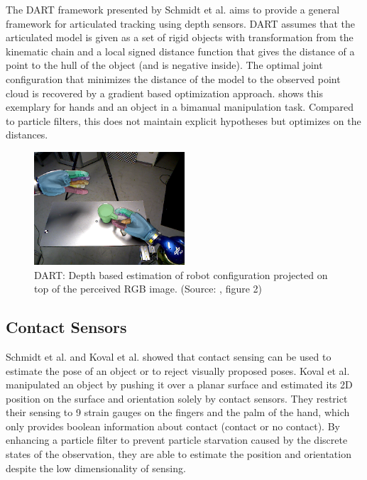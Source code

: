 The DART framework presented by Schmidt et al. \cite{Schmidt2015, Schmidt2015b} aims to provide a general framework for articulated tracking using depth sensors. DART assumes that the articulated model is given as a set of rigid objects with transformation from the kinematic chain and a local signed distance function that gives the distance of a point to the hull of the object (and is negative inside). The optimal joint configuration that minimizes the distance of the model to the observed point cloud is recovered by a gradient based optimization approach.  shows this exemplary for hands and an object in a bimanual manipulation task.
Compared to particle filters, this does not maintain explicit hypotheses but optimizes on the distances.

\begin{figure}[h]
\centering
\includegraphics[width=0.5\textwidth]{images/related_work/dart_estim.png}
\caption[DART manipulator tracking]{DART: Depth based estimation of robot configuration projected on top of the perceived RGB image. (Source: \cite{Schmidt2015b}, figure 2)}
\label{fig:dart_justin_est}
\end{figure}

\subsection{Contact Sensors}

Schmidt et al. \cite{Schmidt2015b} and Koval et al. \cite{Koval2015} showed that contact sensing can be used to estimate the pose of an object or to reject visually proposed poses.
Koval et al. \cite{Koval2015} manipulated an object by pushing it over a planar surface and estimated its 2D position on the surface and orientation solely by contact sensors. They restrict their sensing to 9 strain gauges on the fingers and the palm of the hand, which only provides boolean information about contact (contact or no contact). By enhancing a particle filter to prevent particle starvation caused by the discrete states of the observation, they are able to estimate the position and orientation despite the low dimensionality of sensing.

